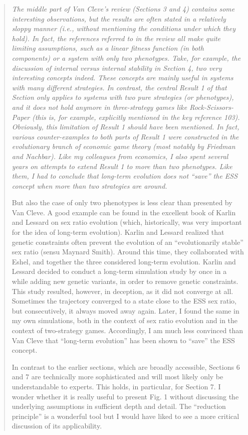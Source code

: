 \documentclass[10pt,parskip=full,foldmarks=off,addrfield=off,backaddress=false,refline=dateleft,letterpaper]{scrlttr2}
\newenvironment{reviewerquote}{\begin{quote}\color{DarkBlue}\itshape}{\end{quote}}
\begin{document}
\begin{letter}
\begin{reviewerquote}
The middle part of Van Cleve’s review (Sections 3 and 4) contains some interesting observations, but the results are often stated in a relatively sloppy manner (i.e., without mentioning the conditions under which they hold). In fact, the references referred to in the review all make quite limiting assumptions, such as a linear fitness function (in both components) or a system with only two phenotypes. Take, for example, the discussion of internal versus internal stability in Section 4, two very interesting concepts indeed. These concepts are mainly useful in systems with many different strategies. In contrast, the central Result 1 of that Section only applies to systems with two pure strategies (or phenotypes), and it does not hold anymore in three-strategy games like Rock-Scissors-Paper (this is, for example, explicitly mentioned in the key reference 103). Obviously, this limitation of Result 1 should have been mentioned. In fact, various counter-examples to both parts of Result 1 were constructed in the evolutionary branch of economic game theory (most notably by Friedman and Nachbar). Like my colleagues from economics, I also spent several years on attempts to extend Result 1 to more than two phenotypes. Like them, I had to conclude that long-term evolution does not “save” the ESS concept when more than two strategies are around.

But also the case of only two phenotypes is less clear than presented by Van Cleve. A good example can be found in the excellent book of Karlin and Lessard on sex ratio evolution (which, historically, was very important for the idea of long-term evolution). Karlin and Lessard realized that genetic constraints often prevent the evolution of an “evolutionarily stable” sex ratio (sensu Maynard Smith). Around this time, they collaborated with Eshel, and together the three considered long-term evolution. Karlin and Lessard decided to conduct a long-term simulation study by once in a while adding new genetic variants, in order to remove genetic constraints. This study resulted, however, in deception, as it did not converge at all. Sometimes the trajectory converged to a state close to the ESS sex ratio, but consecutively, it always moved away again. Later, I found the same in my own simulations, both in the context of sex ratio evolution and in the context of two-strategy games. Accordingly, I am much less convinced than Van Cleve that “long-term evolution” has been shown to “save” the ESS concept.

In contrast to the earlier sections, which are broadly accessible, Sections 6 and 7 are technically more sophisticated and will most likely only be understandable to experts. This holds, in particular, for Section 7. I wonder whether it is really useful to present Fig. 1 without discussing the underlying assumptions in sufficient depth and detail. The “reduction principle” is a wonderful tool but I would have liked to see a more critical discussion of its applicability.


\end{reviewerquote}
\end{letter}
\end{document}

